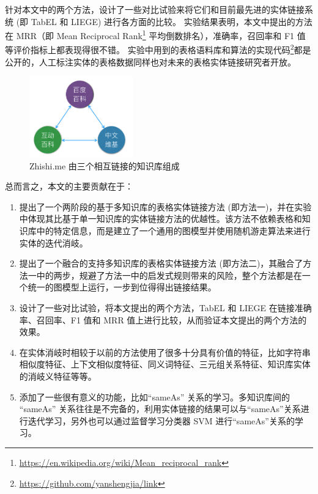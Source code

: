 针对本文中的两个方法，设计了一些对比试验来将它们和目前最先进的实体链接系统 (即 TabEL\cite{bhagavatula2015tabel} 和 LIEGE\cite{shen2012liege}) 进行各方面的比较。
实验结果表明，本文中提出的方法在 MRR（即 Mean Reciprocal Rank\footnote{\url{https://en.wikipedia.org/wiki/Mean_reciprocal_rank}} 平均倒数排名），准确率，召回率和 F1 值等评价指标上都表现得很不错。
实验中用到的表格语料库和算法的实现代码\footnote{\url{https://github.com/yanshengjia/link}}都是公开的，人工标注实体的表格数据同样也对未来的表格实体链接研究者开放。\par

\begin{figure}[htbp]
\centering
\includegraphics[width=0.4\textwidth]{img/zhishime_link}
\caption{Zhishi.me 由三个相互链接的知识库组成}
\label{zhishime_link}
\end{figure}

总而言之，本文的主要贡献在于：
\begin{enumerate}[1.]
  \item 提出了一个两阶段的基于多知识库的表格实体链接方法 (即方法一)，并在实验中体现其比基于单一知识库的实体链接方法的优越性。该方法不依赖表格和知识库中的特定信息，而是建立了一个通用的图模型并使用随机游走算法来进行实体的迭代消岐。
  \item 提出了一个融合的支持多知识库的表格实体链接方法 (即方法二)，其融合了方法一中的两步，规避了方法一中的启发式规则带来的风险，整个方法都是在一个统一的图模型上运行，一步到位得得出链接结果。
  \item 设计了一些对比试验，将本文提出的两个方法，TabEL\cite{bhagavatula2015tabel} 和 LIEGE\cite{shen2012liege} 在链接准确率、召回率、F1 值和 MRR 值上进行比较，从而验证本文提出的两个方法的效果。
  \item 在实体消岐时相较于以前的方法使用了很多十分具有价值的特征，比如字符串相似度特征、上下文相似度特征、同义词特征、三元组关系特征、知识库实体的消岐义特征等等。
  \item 添加了一些很有意义的功能，比如``sameAs'' 关系的学习。多知识库间的 ``sameAs'' 关系往往是不完备的，利用实体链接的结果可以与``sameAs''关系进行迭代学习，另外也可以通过监督学习分类器 SVM\cite{tong2001support} 进行``sameAs''关系的学习。
\end{enumerate}

